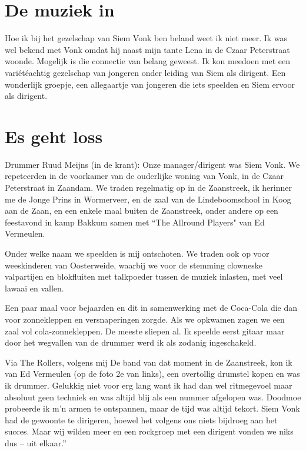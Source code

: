 \documentclass[10pt,twoside,openright]{memoir}
\begin{document}
\chapter{De muziek in} %
\label{cha:muziek_in}

Hoe ik bij het gezelschap van Siem Vonk ben beland weet ik niet meer. Ik was wel bekend met Vonk omdat hij naast mijn tante Lena in de Czaar Peterstraat woonde. Mogelijk is die connectie van belang geweest. Ik kon meedoen met een variétéachtig gezelschap van jongeren onder leiding van Siem als dirigent. Een wonderlijk groepje, een allegaartje van jongeren die iets speelden en Siem ervoor als dirigent.

\chapter{Es geht loss} %
\label{cha:gehtloss}

Drummer Ruud Meijns (in de krant): Onze manager/dirigent was Siem Vonk. We repeteerden in de voorkamer van de ouderlijke woning van Vonk, in de Czaar Peterstraat in Zaandam. We traden regelmatig op in de Zaanstreek, ik herinner me de Jonge Prins in Wormerveer, en de zaal van de Lindeboomschool in Koog aan de Zaan, en een enkele maal buiten de Zaanstreek, onder andere op een feestavond in kamp Bakkum samen met ``The Allround Players" van Ed Vermeulen.

Onder welke naam we speelden is mij ontschoten. We traden ook op voor weeskinderen van Oosterweide, waarbij we voor de stemming clowneske valpartijen en blokfluiten met talkpoeder tussen de muziek inlasten, met veel lawaai en vallen. 

Een paar maal voor bejaarden en dit in samenwerking met de Coca-Cola die dan voor zonnekleppen en versnaperingen zorgde. Als we opkwamen zagen we een zaal vol cola-zonnekleppen. De meeste sliepen al. Ik speelde eerst gitaar maar door het wegvallen van de drummer werd ik als zodanig ingeschakeld. 

Via The Rollers, volgens mij De band van dat moment in de Zaanstreek, kon ik van Ed Vermeulen (op de foto 2e van links), een overtollig drumstel kopen en was ik drummer. Gelukkig niet voor erg lang want ik had dan wel ritmegevoel maar absoluut geen techniek en was altijd blij als een nummer afgelopen was. Doodmoe probeerde ik m'n armen te ontspannen, maar de tijd was altijd tekort. Siem Vonk had de gewoonte te dirigeren, hoewel het volgens ons niets bijdroeg aan het succes. Maar wij wilden meer en een rockgroep met een dirigent vonden we niks dus – uit elkaar.'' 
\end{document}
